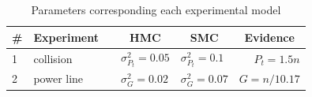 \documentclass{article} %
\newcommand{\tuple}[1] {\langle #1 \rangle}
\newcommand{\bvec}[1]{\textbf{#1}}
\begin{document}
%

\begin{table}[t]
\footnotesize
\caption{Parameters corresponding each experimental model}
\label{t:parameters}
\centering
\begin{tabular}{l l c l l r}
\toprule
\# &\multicolumn{1}{c}{Experiment}  &\multicolumn{1}{c}{} &\multicolumn{1}{c}{HMC} &\multicolumn{1}{c}{SMC} &\multicolumn{1}{c}{Evidence}\\
\midrule
1 & collision 		&      & $\sigma^2_{P_t} = 0.05$ & $\sigma^2_{P_t} = 0.1$ & $P_t = 1.5n$\\
2 & power line		&      & $\sigma^2_{G} = 0.02$    &$\sigma^2_{G} = 0.07$   & $G = n/10.17$ \\
\bottomrule
\end{tabular}
\end{table}
\end{document}
